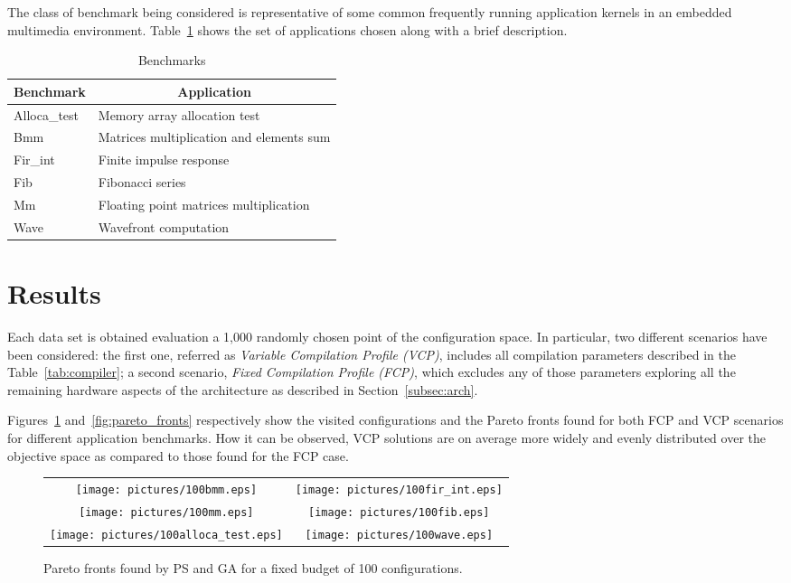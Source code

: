 \begin{itemize}
The class of benchmark being considered is representative of some common
frequently running application kernels in an embedded multimedia
environment. Table~\ref{tab:bench} shows the set of applications
chosen along with a brief description.
\begin{table}
	\centering
	\caption{Benchmarks}
	\label{tab:bench}
	\begin{tabular}{ll}
	\hline
	\multicolumn{1}{c}{Benchmark} & \multicolumn{1}{c}{Application} \\
	\hline
	Alloca\_test & Memory array allocation test \\
	Bmm & Matrices multiplication and elements sum \\
	Fir\_int & Finite impulse response \\
	Fib & Fibonacci series \\
	Mm & Floating point matrices multiplication \\
	Wave & Wavefront computation \\
	\hline
	\end{tabular}
\end{table}

\section{Results}

Each data set is obtained evaluation a 1,000 randomly chosen point of
the configuration space. In particular, two different scenarios have
been considered: the first one, referred as \emph{Variable Compilation
Profile (VCP)}, includes all compilation parameters described
in the Table~\ref{tab:compiler}; a second scenario, \emph{Fixed
Compilation Profile (FCP)}, which excludes any of those parameters
exploring all the remaining hardware aspects of the architecture as
described in Section~\ref{subsec:arch}.

Figures~\ref{fig:pareto_fronts_100} and~\ref{fig:pareto_fronts}
respectively show the visited configurations and the
Pareto fronts found for both FCP and VCP scenarios for different
application benchmarks. How it can be observed, VCP solutions
are on average  more widely and evenly distributed over the objective
space as compared to those found for the FCP case.


\begin{figure}
  \centering
  \begin{tabular}{cc}
    \texttt{[image: pictures/100bmm.eps]} & \texttt{[image: pictures/100fir\_int.eps]} \\
    \texttt{[image: pictures/100mm.eps]} & \texttt{[image: pictures/100fib.eps]} \\
    \texttt{[image: pictures/100alloca\_test.eps]} & \texttt{[image: pictures/100wave.eps]}
  \end{tabular}
  \caption{Pareto fronts found by PS and GA for a fixed budget of 100 configurations.}
  \label{fig:pareto_fronts_100}
\end{figure}


\end{itemize}
